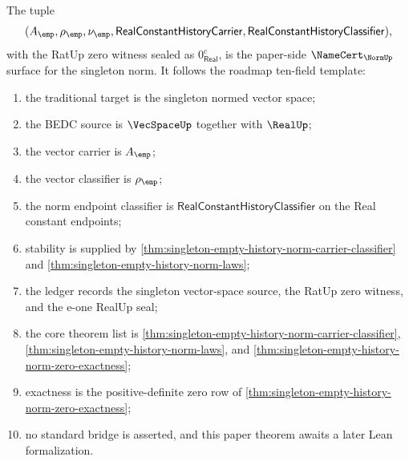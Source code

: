 \begin{theorem}
\label{thm:singleton-empty-history-norm-semantic-namecert-surface}
The tuple
$$
(A_{\emp},\rho_{\emp},\nu_{\emp},
\mathsf{RealConstantHistoryCarrier},
\mathsf{RealConstantHistoryClassifier}),
$$
with the RatUp zero witness sealed as $0_{\mathsf{Real}}^{c}$, is the
paper-side $\NameCert_{\NormUp}$ surface for the singleton norm. It follows the
roadmap ten-field template:
\begin{enumerate}
  \item the traditional target is the singleton normed vector space;
  \item the BEDC source is $\VecSpaceUp$ together with $\RealUp$;
  \item the vector carrier is $A_{\emp}$;
  \item the vector classifier is $\rho_{\emp}$;
  \item the norm endpoint classifier is
  $\mathsf{RealConstantHistoryClassifier}$ on the Real constant endpoints;
  \item stability is supplied by
  \autoref{thm:singleton-empty-history-norm-carrier-classifier} and
  \autoref{thm:singleton-empty-history-norm-laws};
  \item the ledger records the singleton vector-space source, the RatUp zero
  witness, and the e-one RealUp seal;
  \item the core theorem list is
  \autoref{thm:singleton-empty-history-norm-carrier-classifier},
  \autoref{thm:singleton-empty-history-norm-laws}, and
  \autoref{thm:singleton-empty-history-norm-zero-exactness};
  \item exactness is the positive-definite zero row of
  \autoref{thm:singleton-empty-history-norm-zero-exactness};
  \item no standard bridge is asserted, and this paper theorem awaits a
  later Lean formalization.
\end{enumerate}
\end{theorem}
